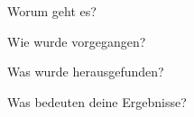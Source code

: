 

Worum geht es?

Wie wurde vorgegangen?

Was wurde herausgefunden?

Was bedeuten deine Ergebnisse?


\blindtext[1]
